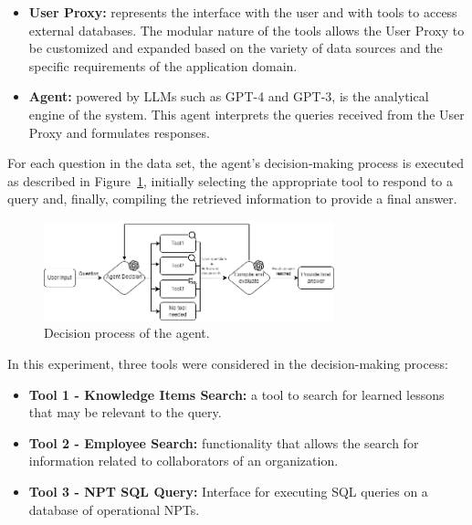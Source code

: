             \begin{itemize}        
                        
                \item \textbf{User Proxy:} represents the interface with the user and with tools to access external databases. The modular nature of the tools allows the User Proxy to be customized and expanded based on the variety of data sources and the specific requirements of the application domain.

                \item \textbf{Agent:} powered by LLMs such as GPT-4 and GPT-3, is the analytical engine of the system. This agent interprets the queries received from the User Proxy and formulates responses.
                                    
            \end{itemize}

            
            For each question in the data set, the agent's decision-making process is executed as described in Figure~\ref{fig:diagrama_agente_1}, initially selecting the appropriate tool to respond to a query and, finally, compiling the retrieved information to provide a final answer.
            
            \begin{figure}[h]
                \centering
                \includegraphics[width=0.75\textwidth]{images/agent_diagram_1.png}
                \caption{Decision process of the agent.}
                \label{fig:diagrama_agente_1}
            \end{figure}                        
                    
            In this experiment, three tools were considered in the decision-making process:

            \begin{itemize}
            
                
                \item \textbf{Tool 1 - Knowledge Items Search:} a tool to search for learned lessons that may be relevant to the query. 
                \label{Tool1}
        
                \item \label{Tool2} \textbf{Tool 2 - Employee Search:} functionality that allows the search for information related to collaborators of an organization.
        
                \item \label{Tool3} \textbf{Tool 3 - NPT SQL Query:} Interface for executing SQL queries on a database of operational NPTs.    
                
            \end{itemize}

